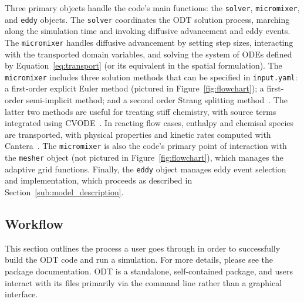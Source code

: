 \documentclass[preprint,12pt, a4paper]{elsarticle}
\begin{document}
Three primary objects handle the code's main functions: the \texttt{solver}, \texttt{micromixer}, and \texttt{eddy} objects. The \texttt{solver} coordinates the ODT solution process, marching along the simulation time and invoking diffusive advancement and eddy events. The \texttt{micromixer} handles diffusive advancement by setting step sizes, interacting with the transported domain variables, and solving the system of ODEs defined by Equation~\ref{eq:transport} (or its equivalent in the spatial formulation). The \texttt{micromixer} includes three solution methods that can be specified in \texttt{input.yaml}: a first-order explicit Euler method (pictured in Figure~\ref{fig:flowchart}); a first-order semi-implicit method; and a second order Strang splitting method~\cite{Strang_1968}. The latter two methods are useful for treating stiff chemistry, with source terms integrated using CVODE~\cite{Hindmarsh_2020}.
In reacting flow cases, enthalpy and chemisal species are transported, with physical properties and kinetic rates computed with Cantera~\cite{Goodwin_2018}. The \texttt{micromixer} is also the code's primary point of interaction with the \texttt{mesher} object (not pictured in Figure~\ref{fig:flowchart}), which manages the adaptive grid functions. Finally, the \texttt{eddy} object manages eddy event selection and implementation, which proceeds as described in Section~\ref{sub:model_description}.  


\subsection{Workflow}
\label{sub:workflow}

This section outlines the process a user goes through in order to successfully build the ODT code and run a simulation. For more details, please see the package documentation. ODT is a standalone, self-contained package, and users interact with its files primarily via the command line rather than a graphical interface. 
\end{document}
